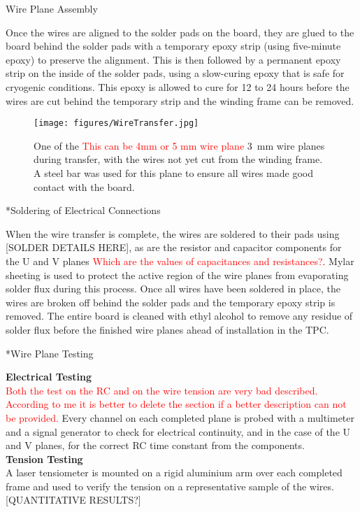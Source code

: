\begin{subsubsection}{Wire Plane Assembly}
\begin{subsubsection}
Once the wires are aligned to the solder pads on the board, they are glued to the board behind the solder pads with a temporary epoxy strip (using five-minute epoxy) to preserve the alignment. This is then followed by a permanent epoxy strip on the inside of the solder pads, using a slow-curing epoxy that is safe for cryogenic conditions. This epoxy is allowed to cure for 12 to 24 hours before the wires are cut behind the temporary strip and the winding frame can be removed.

\begin{figure}[h!]
\centering
\texttt{[image: figures/WireTransfer.jpg]}
\caption{One of the \textcolor{red}{This can be 4mm or 5 mm wire plane} 3~mm wire planes during transfer, with the wires not yet cut from the winding frame. A steel bar was used for this plane to ensure all wires made good contact with the board.}
\label{pic:wiretransfer}
\end{figure}

\end{subsubsection}

\begin{subsubsection}*{Soldering of Electrical Connections}

When the wire transfer is complete, the wires are soldered to their pads using [SOLDER DETAILS HERE], as are the resistor and capacitor components for the U and V planes \textcolor{red}{Which are the values of capacitances and resistances?}. Mylar sheeting is used to protect the active region of the wire planes from evaporating solder flux during this process. Once all wires have been soldered in place, the wires are broken off behind the solder pads and the temporary epoxy strip is removed. The entire board is cleaned with ethyl alcohol to remove any residue of solder flux before the finished wire planes ahead of installation in the TPC.
\end{subsubsection}

\begin{subsubsection}*{Wire Plane Testing}

\textbf{Electrical Testing}\\
\textcolor{red}{Both the test on the RC and on the wire tension are very bad described. According to me it is better to delete the section if a better description can not be provided.}
Every channel on each completed plane is probed with a multimeter and a signal generator to check for electrical continuity, and in the case of the U and V planes, for the correct RC time constant from the components.\\
\textbf{Tension Testing}\\
A laser tensiometer is mounted on a rigid aluminium arm over each completed frame and used to verify the tension on a representative sample of the wires. [QUANTITATIVE RESULTS?]


\end{subsubsection}
\end{subsubsection}
